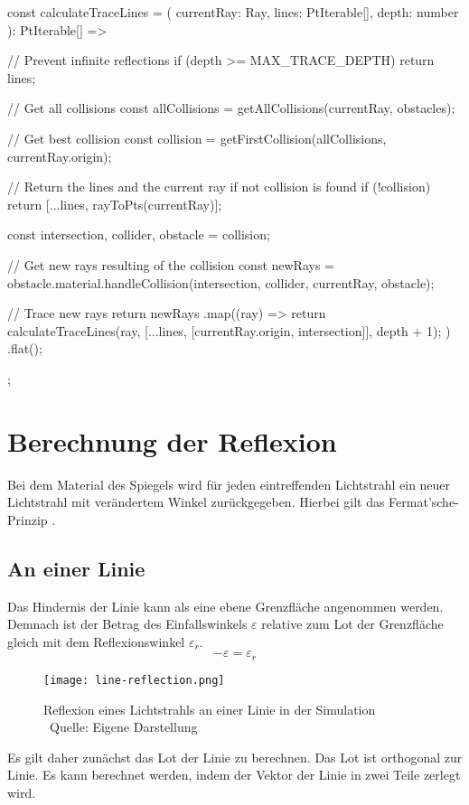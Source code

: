 \begin{verbnobox}[\scriptsize\mbox{}]
const calculateTraceLines = (
    currentRay: Ray,
    lines: PtIterable[],
    depth: number
): PtIterable[] => {
    // Prevent infinite reflections
    if (depth >= MAX_TRACE_DEPTH) return lines;

    // Get all collisions
    const allCollisions = getAllCollisions(currentRay, obstacles);

    // Get best collision
    const collision = getFirstCollision(allCollisions, currentRay.origin);

    // Return the lines and the current ray if not collision is found
    if (!collision) return [...lines, rayToPts(currentRay)];

    const { intersection, collider, obstacle } = collision;

    // Get new rays resulting of the collision
    const newRays = obstacle.material.handleCollision(intersection, collider, currentRay, obstacle);

    // Trace new rays
    return newRays
        .map((ray) => {
            return calculateTraceLines(ray, [...lines, [currentRay.origin, intersection]], depth + 1);
        })
        .flat();
    };
\end{verbnobox}

\section{Berechnung der Reflexion}
Bei dem Material des Spiegels wird für jeden eintreffenden Lichtstrahl ein neuer Lichtstrahl mit verändertem Winkel zurückgegeben. 
Hierbei gilt das Fermat’sche-Prinzip \parencite[vgl.][S. 20]{hering2017optik}.


\subsection*{An einer Linie}
Das Hindernis der Linie kann als eine ebene Grenzfläche angenommen werden. 
Demnach ist der Betrag des Einfallswinkels $ \varepsilon $ relative zum Lot der Grenzfläche gleich mit dem Reflexionswinkel $ \varepsilon_r $. 
\begin{equation}
    -\varepsilon = \varepsilon_r
\end{equation}
\begin{figure}
    \centering
    \texttt{[image: line-reflection.png]}

    \caption{Reflexion eines Lichtstrahls an einer Linie in der Simulation  \\ Quelle: Eigene Darstellung}

\end{figure}
Es gilt daher zunächst das Lot der Linie zu berechnen. Das Lot ist orthogonal zur Linie. 
Es kann berechnet werden, indem der Vektor der Linie in zwei Teile zerlegt wird. \parencite[vgl.][S. 1]{greve2006raytracing}

